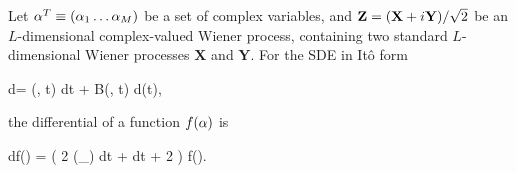 \begin{theorem}
\label{thm:fpe-sde:ito-formula:ito-f-complex}
	Let $\mathbf{\alpha}^T \equiv (\alpha_1 \ldots \alpha_M)$ be a set of complex variables, and $\mathbf{Z} = (\mathbf{X} + i\mathbf{Y}) / \sqrt{2}$ be an $L$-dimensional complex-valued Wiener process, containing two standard $L$-dimensional Wiener processes $\mathbf{X}$ and $\mathbf{Y}$.
	For the SDE in It\^{o} form
	\begin{eqn*}
		d\balpha = \avec(\balpha, t) dt + B(\balpha, t) d\Zvec(t),
	\end{eqn*}
	the differential of a function $f(\mathbf{\alpha})$ is
	\begin{eqn*}
		df(\balpha) = \left(
			2 \Real (\avec \cdot \vcwd_{\balpha}) dt
			+ \Trace{ B B^H \vcwd_{\balpha^*} \vcwd_{\balpha}^T } dt
			+ 2 \Real \Trace{ B d\Zvec \vcwd_{\balpha}^T }
		\right) f(\balpha).
	\end{eqn*}
\end{theorem}
